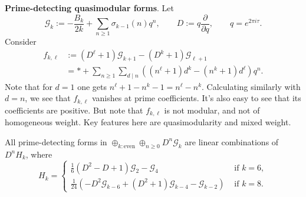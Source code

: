 \documentclass[reqno]{amsart} 
\begin{document}
\textbf{Prime-detecting quasimodular forms}.  Let
\begin{equation*}
  \mathcal{G}_k := - \frac{B_k}{2 k} + \sum_{n \geq  1} \sigma_{k - 1}(n) q^n,
  \qquad
  D := q \frac{\partial}{\partial q},
  \qquad q = e^{2 \pi i \tau}.
\end{equation*}
Consider
\begin{align*}
  f_{k, \ell} &:=(D^{\ell} + 1) \mathcal{G}_{k + 1} -(D^k + 1) \mathcal{G}_{\ell + 1} \\
              &= \ast + \sum_{n \geq 1} \sum_{d \mid n} \left((n^{\ell} + 1) d^k -(n^k + 1) d^{\ell} \right) q^n.
\end{align*}
Note that for $d = 1$ one gets $n^{\ell} + 1 - n^k - 1 = n^{\ell} - n^k$.  Calculating similarly with $d = n$, we see that $f_{k, \ell}$ vanishes at prime coefficients.  It's also easy to see that its coefficients are positive.  But note that $f_{k, \ell}$ is not modular, and not of homogeneous weight.  Key features here are quasimodularity and mixed weight.

\begin{theorem} All prime-detecting forms in $\oplus_{k: \text{even}} \oplus_{n \geq 0} D^n \mathcal{G}_k$ are linear combinations of $D^n H_{k}$, where
  \begin{equation*}
    H_k =
    \begin{cases}
      \frac{1}{6}(D^2 - D + 1) \mathcal{G}_2 - \mathcal{G}_4      &  \text{ if } k = 6, \\
      \frac{1}{24} \left( - D^2 \mathcal{G}_{k - 6} +(D^2 + 1) \mathcal{G}_{k - 4} - \mathcal{G}_{k - 2} \right)                                                                  & \text{ if } k = 8.
    \end{cases}
  \end{equation*}
\end{theorem}
\end{document}
